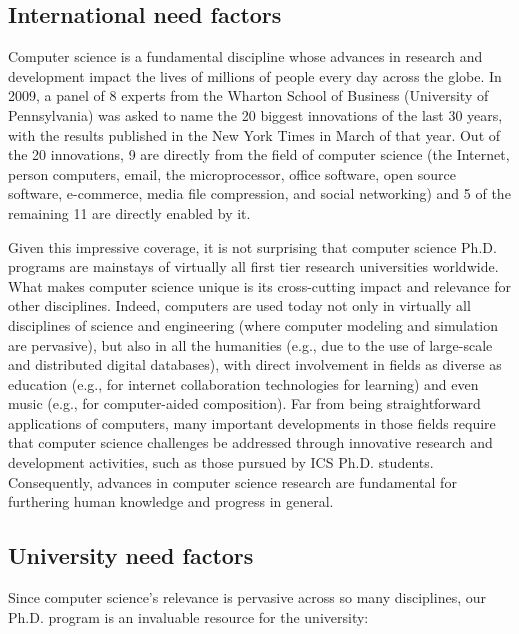 \documentclass[12pt]{article}
\begin{document}
\subsection{International need factors}

Computer science is a fundamental discipline whose advances in research and
development impact the lives of millions of people every day across the globe. In 2009, a
panel of 8 experts from the Wharton School of Business (University of
Pennsylvania) was asked to name the 20 biggest innovations of the last 30
years, with the results published in the New York Times in March of that
year. Out of the 20 innovations, 9 are directly from the field of computer
science (the Internet, person computers, email, the microprocessor, office
software, open source software, e-commerce, media file compression, and
social networking) and 5 of the remaining 11 are directly enabled by it.

Given this impressive coverage, it is not surprising that computer science
Ph.D. programs are mainstays of virtually all first tier research
universities worldwide.  What makes computer science unique is its
cross-cutting impact and relevance for other disciplines. Indeed, computers
are used today not only in virtually all disciplines of science and
engineering (where computer modeling and simulation are pervasive), but
also in all the humanities (e.g., due to the use of large-scale and
distributed digital databases), with direct involvement in fields as
diverse as education (e.g., for internet collaboration technologies for
learning) and even music (e.g., for computer-aided composition).  Far from
being straightforward applications of computers, many important
developments in those fields require that computer science challenges be
addressed through innovative research and development activities, such as
those pursued by ICS Ph.D. students.  Consequently, advances in computer
science research are fundamental for furthering human knowledge and
progress in general.

\subsection{University need factors}

Since computer science's relevance is pervasive across so many disciplines,
our Ph.D. program is an invaluable resource for the university:
\end{document}
